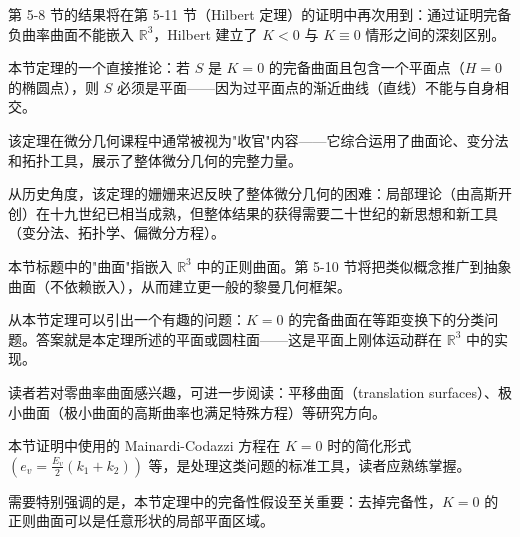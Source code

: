 \begin{Remark}
\begin{Remark}
第 5-8 节的结果将在第 5-11 节（Hilbert 定理）的证明中再次用到：通过证明完备负曲率曲面不能嵌入 $\mathbb{R}^3$，Hilbert 建立了 $K<0$ 与 $K \equiv 0$ 情形之间的深刻区别。
\end{Remark}

\begin{Remark}
本节定理的一个直接推论：若 $S$ 是 $K=0$ 的完备曲面且包含一个平面点（$H=0$ 的椭圆点），则 $S$ 必须是平面——因为过平面点的渐近曲线（直线）不能与自身相交。
\end{Remark}

\begin{Remark}
该定理在微分几何课程中通常被视为"收官"内容——它综合运用了曲面论、变分法和拓扑工具，展示了整体微分几何的完整力量。
\end{Remark}

\begin{Remark}
从历史角度，该定理的姗姗来迟反映了整体微分几何的困难：局部理论（由高斯开创）在十九世纪已相当成熟，但整体结果的获得需要二十世纪的新思想和新工具（变分法、拓扑学、偏微分方程）。
\end{Remark}

\begin{Remark}
本节标题中的"曲面"指嵌入 $\mathbb{R}^3$ 中的正则曲面。第 5-10 节将把类似概念推广到抽象曲面（不依赖嵌入），从而建立更一般的黎曼几何框架。
\end{Remark}

\begin{Remark}
从本节定理可以引出一个有趣的问题：$K=0$ 的完备曲面在等距变换下的分类问题。答案就是本定理所述的平面或圆柱面——这是平面上刚体运动群在 $\mathbb{R}^3$ 中的实现。
\end{Remark}

\begin{Remark}
读者若对零曲率曲面感兴趣，可进一步阅读：平移曲面（translation surfaces）、极小曲面（极小曲面的高斯曲率也满足特殊方程）等研究方向。
\end{Remark}

\begin{Remark}
本节证明中使用的 Mainardi-Codazzi 方程在 $K=0$ 时的简化形式 $(e_v = \frac{E_v}{2}(k_1+k_2))$ 等，是处理这类问题的标准工具，读者应熟练掌握。
\end{Remark}

\begin{Remark}
需要特别强调的是，本节定理中的完备性假设至关重要：去掉完备性，$K=0$ 的正则曲面可以是任意形状的局部平面区域。
\end{Remark}


\end{Remark}
